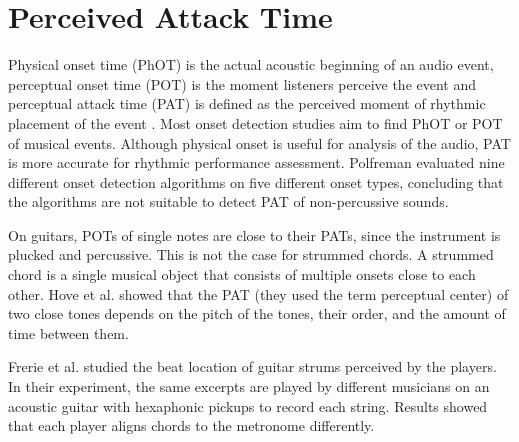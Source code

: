 \section{Perceived Attack Time}

Physical onset time (PhOT) is the actual acoustic beginning of an audio event, perceptual onset time (POT) is the moment listeners perceive the event and perceptual attack time (PAT) is defined as the perceived moment of rhythmic placement of the event \cite{wright2008shape}. Most onset detection studies aim to find PhOT or POT of musical events. Although physical onset is useful for analysis of the audio, PAT is more accurate for rhythmic performance assessment. Polfreman \cite{polfreman2013} evaluated nine different onset detection algorithms on five different onset types, concluding that the algorithms are not suitable to detect PAT of non-percussive sounds. 

On guitars, POTs of single notes are close to their PATs, since the instrument is plucked and percussive. This is not the case for strummed chords. A strummed chord is a single musical object that consists of multiple onsets close to each other. Hove et al. \cite{hove2007sensorimotor} showed that the PAT (they used the term perceptual center) of two close tones depends on the pitch of the tones, their order, and the amount of time between them. 
    
Frerie et al. \cite{freire2018strumming} studied the beat location of guitar strums perceived by the players. In their experiment, the same excerpts are played by different musicians on an acoustic guitar with hexaphonic pickups to record each string. Results showed that each player aligns chords to the metronome differently.
